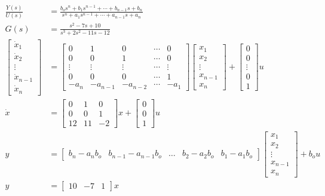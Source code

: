 \documentclass[main.tex]{subfiles}
\begin{document}
\begin{enumerate}
\begin{enumerate}
    $$
    \begin{aligned}
    \frac{Y(s)}{U(s)} &= \frac{b_o s^n+b_1 s^{n-1}+\cdots+b_{n-1} s+b_n}{s^n+a_1 s^{n-1}+\cdots+a_{n-1} s+a_n}\\
    G(s) &= \frac{s^2 - 7s + 10}{s^3+2 s^2-11 s-12}\\
    \left[\begin{array}{c}
    \dot{x}_1 \\
    \dot{x}_2 \\
    \vdots \\
    \dot{x}_{n-1} \\
    \dot{x}_n
    \end{array}\right] &= \left[\begin{array}{ccccc}
    0 & 1 & 0 & \cdots & 0 \\
    0 & 0 & 1 & \cdots & 0 \\
    \vdots & \vdots & \vdots & \cdots & \vdots \\
    0 & 0 & 0 & \cdots & 1 \\
    -a_n & -a_{n-1} & -a_{n-2} & \cdots & -a_1
    \end{array}\right]\left[\begin{array}{c}
    x_1 \\
    x_2 \\
    \vdots \\
    x_{n-1} \\
    x_n
    \end{array}\right]+\left[\begin{array}{c}
    0 \\
    0 \\
    \vdots \\
    0 \\
    1
    \end{array}\right] u\\
    \dot{x} &= \left[\begin{array}{ccc}
    0 & 1 & 0 \\
    0 & 0 & 1 \\
    12 & 11 & -2
    \end{array}\right] x + \left[\begin{array}{l}
    0 \\
    0 \\
    1
    \end{array}\right] u \\
    y &= \left[\begin{array}{lllll}
    b_n-a_n b_o & b_{n-1}-a_{n-1} b_o & \ldots & b_2-a_2 b_o & b_1-a_1 b_o
    \end{array}\right]\left[\begin{array}{c}
    x_1 \\
    x_2 \\
    \vdots \\
    x_{n-1} \\
    x_n
    \end{array}\right]+b_o u \\
    y &= \left[\begin{array}{lll}
    10 & -7 & 1
    \end{array}\right] x
    \end{aligned}
    $$
    

\end{enumerate}
\end{enumerate}
\end{document}
